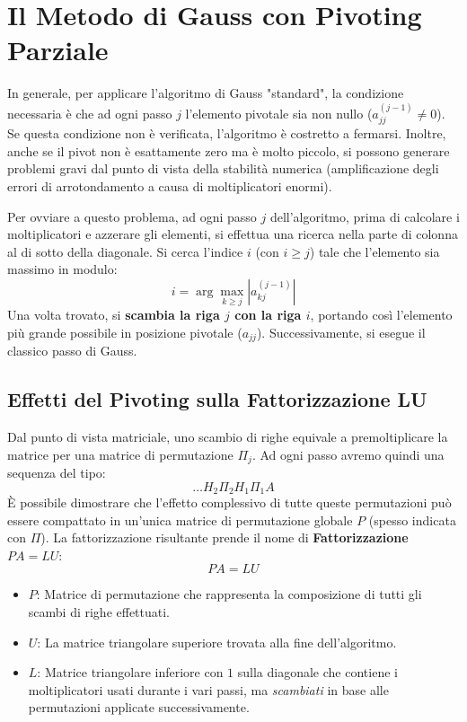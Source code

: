 \documentclass[a4paper,12pt]{article}
\begin{document}
	\section{Il Metodo di Gauss con Pivoting Parziale}
	
	In generale, per applicare l'algoritmo di Gauss "standard", la condizione necessaria è che ad ogni passo $j$ l'elemento pivotale sia non nullo ($a_{jj}^{(j-1)} \neq 0$). Se questa condizione non è verificata, l'algoritmo è costretto a fermarsi.
	Inoltre, anche se il pivot non è esattamente zero ma è molto piccolo, si possono generare problemi gravi dal punto di vista della stabilità numerica (amplificazione degli errori di arrotondamento a causa di moltiplicatori enormi).
	
	\begin{tcolorbox}[title=Pivoting Parziale (o per Colonne), colback=blue!5!white, colframe=blue!75!black]
		Per ovviare a questo problema, ad ogni passo $j$ dell'algoritmo, prima di calcolare i moltiplicatori e azzerare gli elementi, si effettua una ricerca nella parte di colonna al di sotto della diagonale.
		Si cerca l'indice $i$ (con $i \ge j$) tale che l'elemento sia massimo in modulo:
		$$ i = \arg\max_{k \ge j} |a_{kj}^{(j-1)}| $$
		Una volta trovato, si \textbf{scambia la riga $j$ con la riga $i$}, portando così l'elemento più grande possibile in posizione pivotale ($a_{jj}$). Successivamente, si esegue il classico passo di Gauss.
	\end{tcolorbox}
	
	\subsection{Effetti del Pivoting sulla Fattorizzazione LU}
	Dal punto di vista matriciale, uno scambio di righe equivale a premoltiplicare la matrice per una matrice di permutazione $\Pi_j$. Ad ogni passo avremo quindi una sequenza del tipo:
	$$ \dots H_2 \Pi_2 H_1 \Pi_1 A $$
	È possibile dimostrare che l'effetto complessivo di tutte queste permutazioni può essere compattato in un'unica matrice di permutazione globale $P$ (spesso indicata con $\Pi$). 
	La fattorizzazione risultante prende il nome di \textbf{Fattorizzazione $PA = LU$}:
	\begin{equation}
		P A = L U
	\end{equation}
	\begin{itemize}
		\item $P$: Matrice di permutazione che rappresenta la composizione di tutti gli scambi di righe effettuati.
		\item $U$: La matrice triangolare superiore trovata alla fine dell'algoritmo.
		\item $L$: Matrice triangolare inferiore con $1$ sulla diagonale che contiene i moltiplicatori usati durante i vari passi, ma \textit{scambiati} in base alle permutazioni applicate successivamente.
	\end{itemize}
	
\end{document}
